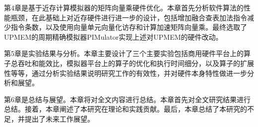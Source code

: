 第4章是基于近存计算模拟器的矩阵向量乘硬件优化。本章首先分析软件算法的性能瓶颈，在此基础上对近存硬件进行进一步的设计，包括增加融合查表加法指令减少指令条数，以及使用向量单元向量化访存和计算加速矩阵向量乘。最终选取了UPMEM的周期精确模拟器PIMulator实现上述对UPMEM的硬件改动。

第5章是实验结果与分析。本章主要设计了三个主要实验包括商用硬件平台上的算子总吞吐和能效比，模拟器平台上的算子的优化和执行时间细分，以及算子的扩展性等等，通过分析实验结果说明研究工作的有效性，并对硬件本身特性做进一步分析和展望。

第6章是总结与展望。本章将对全文内容进行总结。本章首先对全文研究结果进行总结。接着，本章阐述了本研究在理论和实践贡献。最后，本章总结了本研究的不足，并提出了未来工作展望。